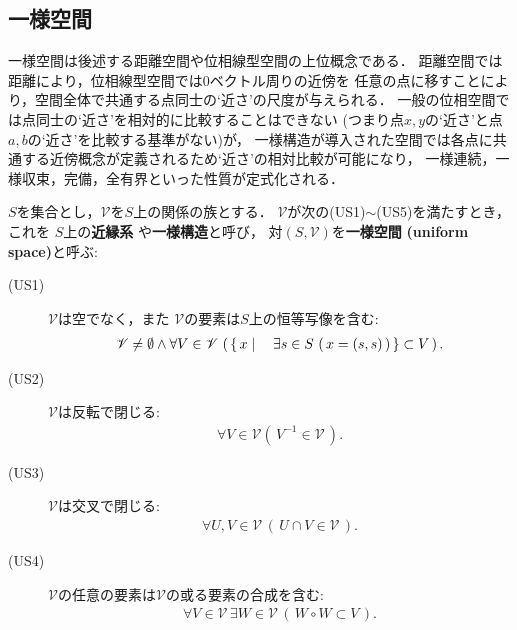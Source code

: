 \subsection{一様空間}
	一様空間は後述する距離空間や位相線型空間の上位概念である．
	距離空間では距離により，位相線型空間では$0$ベクトル周りの近傍を
	任意の点に移すことにより，空間全体で共通する点同士の`近さ'の尺度が与えられる．
	一般の位相空間では点同士の`近さ'を相対的に比較することはできない
	(つまり点$x,y$の`近さ'と点$a,b$の`近さ'を比較する基準がない)が，
	一様構造が導入された空間では各点に共通する近傍概念が定義されるため`近さ'の相対比較が可能になり，
	一様連続，一様収束，完備，全有界といった性質が定式化される．
	
	\begin{screen}
		\begin{dfn}[近縁系]\label{dfn:uniform_structure}
			$S$を集合とし，$\mathscr{V}$を$S$上の関係の族とする．
			$\mathscr{V}$が次の(US1)$\sim$(US5)を満たすとき，これを
			$S$上の{\bf 近縁系}
			や{\bf 一様構造}と呼び，
			対$(S,\mathscr{V})$を{\bf 一様空間}
			{\bf (uniform space)}と呼ぶ:
			\begin{description}
				\item[(US1)] $\mathscr{V}$は空でなく，また
					$\mathscr{V}$の要素は$S$上の恒等写像を含む:
					\begin{align}
						\mathscr{V} \neq \emptyset
						\wedge \forall V \in \mathscr{V}\,
						\left(\, \left\{\, x \mid \quad \exists s \in S\, \left(\, x=(s,s)\, \right)\, \right\} \subset V\, \right).
					\end{align}
					
				\item[(US2)] $\mathscr{V}$は反転で閉じる:
					\begin{align}
						\forall V \in \mathscr{V} 
						\left(\, V^{-1} \in \mathscr{V}\, \right).
					\end{align}
					
				\item[(US3)] $\mathscr{V}$は交叉で閉じる:
					\begin{align}
						\forall U,V \in \mathscr{V}\, \left(\, 
						U \cap V \in \mathscr{V}\, \right).
					\end{align}
					
				\item[(US4)] $\mathscr{V}$の任意の要素は$\mathscr{V}$の或る要素の合成を含む:
					\begin{align}
						\forall V \in \mathscr{V}\, 
						\exists W \in \mathscr{V}\,
						\left(\, W \circ W \subset V\, \right). 
					\end{align}
					

\end{description}
\end{dfn}
\end{screen}
